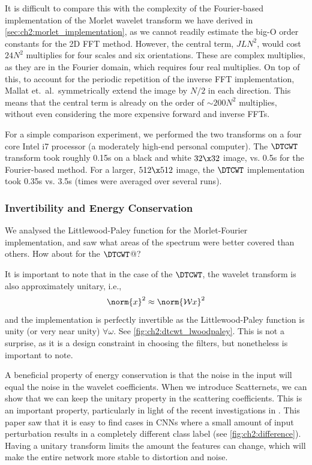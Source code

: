   It is difficult to compare this with the complexity of the Fourier-based
  implementation of the Morlet wavelet transform we have derived in
  \autoref{sec:ch2:morlet_implementation}, as we cannot readily estimate the big-O
  order constants for the 2D FFT method. However, the central term, $JLN^2$,
  would cost $24N^2$ multiplies for four scales and six orientations. These are
  complex multiplies, as they are in the Fourier domain, which requires
  four real multiplies. On top of this, to account for the periodic repetition 
  of the inverse FFT implementation, Mallat et.\ al.\ symmetrically extend the image by
  $N/2$ in each direction. This means that the central term is already on the
  order of $\sim 200N^2$ multiplies, without even considering the more
  expensive forward and inverse FFTs. 

  For a simple comparison experiment, we performed the two transforms on a four
  core Intel i7 processor (a moderately high-end personal computer). The
  $\DTCWT$ transform took roughly 0.15s on a black and
  white $32\x 32$ image, vs. 0.5s for the Fourier-based method. For a larger,
  $512\x 512$ image, the $\DTCWT$ implementation took 0.35s vs. 3.5s
  (times were averaged over several runs).
  
\subsubsection{Invertibility and Energy Conservation}
  We analysed the Littlewood-Paley function for the Morlet-Fourier
  implementation, and saw what areas of the spectrum were better covered than
  others. How about for the $\DTCWT$@?

  It is important to note that in the case of the $\DTCWT$, the wavelet
  transform is also approximately unitary, i.e.,\
  \begin{equation}
    \norm{x}^2 \approx \norm{\mathcal{W}x}^2
  \end{equation}
  and the implementation is perfectly invertible as the Littlewood-Paley
  function is unity (or very near unity) $\forall \omega$. See
  \autoref{fig:ch2:dtcwt_lwoodpaley}. This is not a surprise, as it is a design
  constraint in choosing the filters, but nonetheless is important to note. 

  A beneficial property of energy conservation is that the noise in the input
  will equal the noise in the wavelet coefficients. When we introduce
  Scatternets, we can show that we can keep the unitary property in the
  scattering coefficients. This is an important property, particularly in light
  of the recent investigations in \citep{szegedy_intriguing_2013}. This paper
  saw that it is easy to find cases in CNNs where a small amount of input
  perturbation results in a completely different class label (see
  \autoref{fig:ch2:difference}). Having a unitary transform limits the
  amount the features can change, which will make the entire network more
  stable to distortion and noise.

